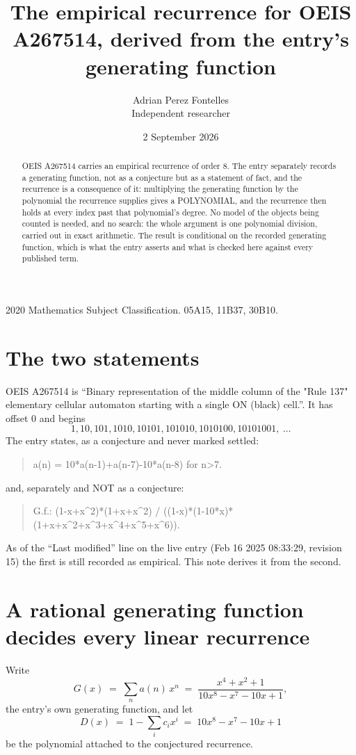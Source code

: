 \documentclass[11pt,a4paper]{article}
\title{The empirical recurrence for OEIS A267514, derived from the entry's generating function}
\author{Adrian Perez Fontelles\\ \small Independent researcher}
\date{2 September 2026}
\theoremstyle{plain}
\theoremstyle{definition}
\begin{document}
\maketitle

\begin{abstract}
OEIS A267514 carries an empirical recurrence of order $8$. The entry separately records a
generating function, not as a conjecture but as a statement of fact, and the recurrence is a
consequence of it: multiplying the generating function by the polynomial the recurrence
supplies gives a POLYNOMIAL, and the recurrence then holds at every index past that
polynomial's degree. No model of the objects being counted is needed, and no search: the
whole argument is one polynomial division, carried out in exact arithmetic. The result is
conditional on the recorded generating function, which is what the entry asserts and what is
checked here against every published term.
\end{abstract}

\noindent\small 2020 Mathematics Subject Classification. 05A15, 11B37, 30B10.\normalsize

\section{The two statements}

OEIS A267514 is ``Binary representation of the middle column of the "Rule 137" elementary cellular automaton starting with a single ON (black) cell.''. It has offset $0$ and begins
\[
1, 10, 101, 1010, 10101, 101010, 1010100, 10101001,\ \dots
\]
The entry states, as a conjecture and never marked settled:
\begin{quote}
a(n) = 10*a(n-1)+a(n-7)-10*a(n-8) for n>7.
\end{quote}
and, separately and NOT as a conjecture:
\begin{quote}
G.f.: (1-x+x\^{}2)*(1+x+x\^{}2) / ((1-x)*(1-10*x)*(1+x+x\^{}2+x\^{}3+x\^{}4+x\^{}5+x\^{}6)).
\end{quote}
As of the ``Last modified'' line on the live entry (Feb 16 2025 08:33:29, revision 15) the first is still
recorded as empirical. This note derives it from the second.

\section{A rational generating function decides every linear recurrence}

Write
\[
G(x)\;=\;\sum_{n}a(n)\,x^{n}\;=\;\frac{x^{4} + x^{2} + 1}{10 x^{8} - x^{7} - 10 x + 1},
\]
the entry's own generating function, and let
\[
D(x)\;=\;1-\sum_i c_i x^{i}\;=\;10 x^{8} - x^{7} - 10 x + 1
\]
be the polynomial attached to the conjectured recurrence.
\end{document}

